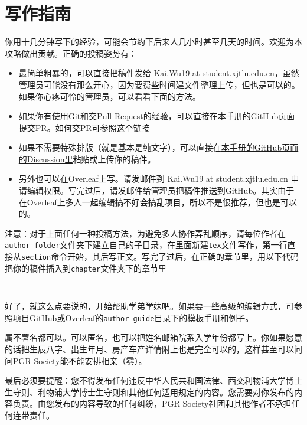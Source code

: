 \chapter{写作指南}
\label{chapter.author-ins}


你用十几分钟写下的经验，可能会节约下后来人几小时甚至几天的时间。欢迎为本攻略做出贡献。正确的投稿姿势有：

\begin{itemize}
    \item 最简单粗暴的，可以直接把稿件发给 Kai.Wu19 at student.xjtlu.edu.cn，虽然管理员可能没有那么开心，因为要费些时间建文件整理上传，但也是可以的。如果你心疼可怜的管理员，可以看看下面的方法。
    \item 如果你有使用Git和交Pull Request的经验，可以直接在\href{https://github.com/kaiwu-astro/xp_pgrs_unofficial_guide}{本手册的GitHub页面}提交PR。\href{https://www.zhihu.com/question/21682976/answer/79489643}{如何交PR可参照这个链接}
    \item 如果不需要特殊排版（就是基本是纯文字），可以直接在\href{https://github.com/kaiwu-astro/xp_pgrs_unofficial_guide/discussions}{本手册的GitHub页面的Discussion里}粘贴或上传你的稿件。
    \item 另外也可以在Overleaf上写。请发邮件到 Kai.Wu19 at student.xjtlu.edu.cn 申请编辑权限。写完过后，请发邮件给管理员把稿件推送到GitHub。其实由于在Overleaf上多人一起编辑搞不好会搞乱项目，所以不是很推荐，但也是可以的。
\end{itemize} 

\vspace{5mm}
注意：对于上面任何一种投稿方法，为避免多人协作弄乱顺序，请每位作者在\texttt{author-folder}文件夹下建立自己的子目录，在里面新建\texttt{tex}文件写作，第一行直接从\texttt{section}命令开始，其后写正文。写完了过后，在正确的章节里，用以下代码把你的稿件插入到\texttt{chapter}文件夹下的章节里
\begin{lstlisting}
    
\end{lstlisting} 

\vspace{5mm}
好了，就这么点要说的，开始帮助学弟学妹吧。如果要一些高级的编辑方式，可参照项目GitHub或Overleaf的\texttt{author-guide}目录下的模板手册和例子。

属不署名都可以。可以匿名，也可以把姓名邮箱院系入学年份都写上。你如果愿意的话把生辰八字、出生年月、房产车产详情附上也是完全可以的，这样甚至可以问问PGR Society能不能安排相亲（雾）。

最后必须要提醒：您不得发布任何违反中华人民共和国法律、西交利物浦大学博士生守则、利物浦大学博士生守则和其他任何适用规定的内容。您需要对你发布的内容负责。由您发布的内容导致的任何纠纷，PGR Society社团和其他作者不承担任何连带责任。